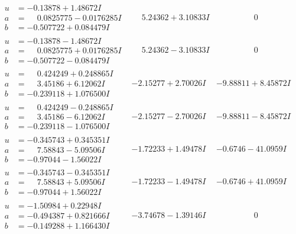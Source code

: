 \documentclass[1p]{elsarticle_modified}
\theoremstyle{definition}
\begin{document}
$$\begin{array}{c|c|c}
\begin{aligned}
u &= -0.13878 + 1.48672 I \\
a &= \phantom{-}0.0825775 - 0.0176285 I \\
b &= -0.507722 + 0.084479 I\end{aligned}
 & \phantom{-}5.24362 + 3.10833 I & \phantom{-0.000000 } 0 \\ \hline\begin{aligned}
u &= -0.13878 - 1.48672 I \\
a &= \phantom{-}0.0825775 + 0.0176285 I \\
b &= -0.507722 - 0.084479 I\end{aligned}
 & \phantom{-}5.24362 - 3.10833 I & \phantom{-0.000000 } 0 \\ \hline\begin{aligned}
u &= \phantom{-}0.424249 + 0.248865 I \\
a &= \phantom{-}3.45186 + 6.12062 I \\
b &= -0.239118 + 1.076500 I\end{aligned}
 & -2.15277 + 2.70026 I & -9.88811 + 8.45872 I \\ \hline\begin{aligned}
u &= \phantom{-}0.424249 - 0.248865 I \\
a &= \phantom{-}3.45186 - 6.12062 I \\
b &= -0.239118 - 1.076500 I\end{aligned}
 & -2.15277 - 2.70026 I & -9.88811 - 8.45872 I \\ \hline\begin{aligned}
u &= -0.345743 + 0.345351 I \\
a &= \phantom{-}7.58843 - 5.09506 I \\
b &= -0.97044 - 1.56022 I\end{aligned}
 & -1.72233 + 1.49478 I & -0.6746 - 41.0959 I \\ \hline\begin{aligned}
u &= -0.345743 - 0.345351 I \\
a &= \phantom{-}7.58843 + 5.09506 I \\
b &= -0.97044 + 1.56022 I\end{aligned}
 & -1.72233 - 1.49478 I & -0.6746 + 41.0959 I \\ \hline\begin{aligned}
u &= -1.50984 + 0.22948 I \\
a &= -0.494387 + 0.821666 I \\
b &= -0.149288 + 1.166430 I\end{aligned}
 & -3.74678 - 1.39146 I & \phantom{-0.000000 } 0 \\ \hline\begin{aligned}

\end{aligned}
\end{array}$$
\end{document}
